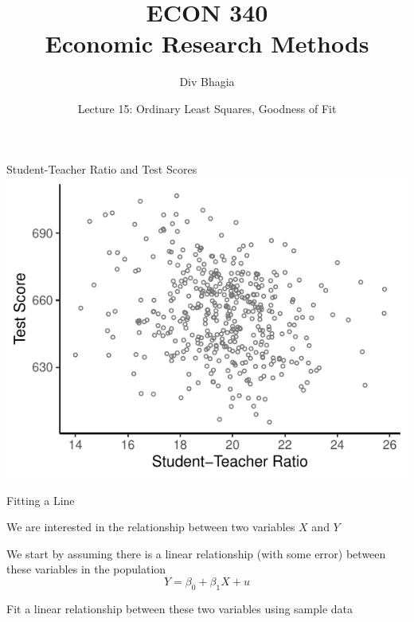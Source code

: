 \documentclass{./../div_teaching_slides}
\begin{document}
\title{ECON 340 \\ Economic Research Methods}
\author{Div Bhagia}
\date{Lecture 15: Ordinary Least Squares, Goodness of Fit}

\begin{frame}
\maketitle
\end{frame}


\begin{frame}{Student-Teacher Ratio and Test Scores}
\centering
\includegraphics{./../../output/lrm_caschool_scatter1.pdf}
\end{frame}

\begin{frame}{Fitting a Line}
\begin{witemize}
  \item We are interested in the relationship between two variables $X$ and $Y$
  \item We start by assuming there is a linear relationship (with some error) between these variables in the population 
 $$ Y = \beta_0 + \beta_1 X + u $$
  \item Fit a linear relationship between these two variables using sample data
\end{witemize}
\end{frame}
\end{document}
